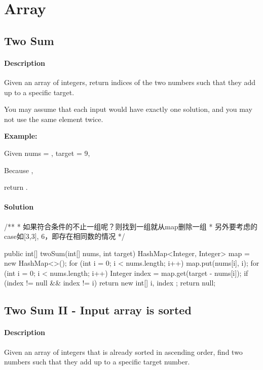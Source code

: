 \chapter{Array}

\section{Two Sum} %

\subsubsection{Description}
Given an array of integers, return indices of the two numbers such that they add up to a specific target.

You may assume that each input would have exactly one solution, and you may not use the same element twice.

\textbf{Example:}

Given nums = \code{[2, 7, 11, 15]}, target = 9,

Because ,

return \code{[0, 1]}.

\subsubsection{Solution}

\begin{Code}
/**
 * 如果符合条件的不止一组呢？则找到一组就从map删除一组
 * 另外要考虑的case如[3,3], 6，即存在相同数的情况
 */

public int[] twoSum(int[] nums, int target) {
    HashMap<Integer, Integer> map = new HashMap<>();
    for (int i = 0; i < nums.length; i++) {
        map.put(nums[i], i);
    }
    for (int i = 0; i < nums.length; i++) {
        Integer index = map.get(target - nums[i]);
        if (index != null && index != i) {
            return new int[] {
                    i, index
            };
        }
    }
    return null;
}
\end{Code}

\newpage

\section{Two Sum II - Input array is sorted} %

\subsubsection{Description}
Given an array of integers that is already sorted in ascending order, find two numbers such that they add up to a specific target number.

